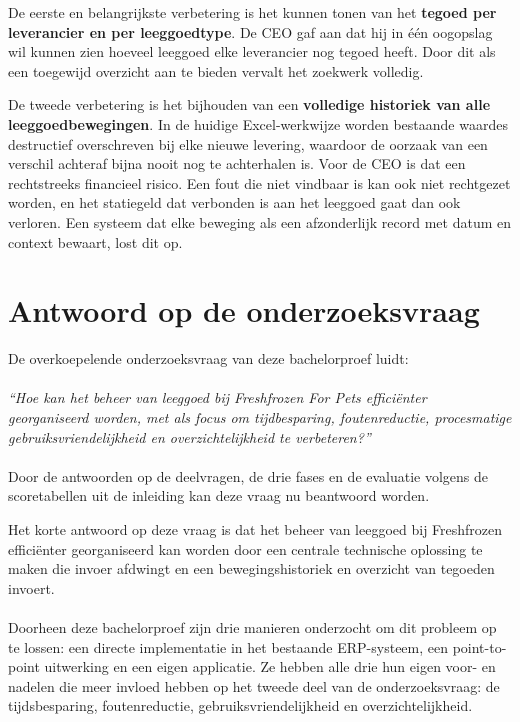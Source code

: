 De eerste en belangrijkste verbetering is het kunnen tonen van het \textbf{tegoed per leverancier en per leeggoedtype}. De CEO gaf aan dat hij in één oogopslag wil kunnen zien hoeveel leeggoed elke leverancier nog tegoed heeft. Door dit als een toegewijd overzicht aan te bieden vervalt het zoekwerk volledig.

De tweede verbetering is het bijhouden van een \textbf{volledige historiek van alle leeggoedbewegingen}. In de huidige Excel-werkwijze worden bestaande waardes destructief overschreven bij elke nieuwe levering, waardoor de oorzaak van een verschil achteraf bijna nooit nog te achterhalen is. Voor de CEO is dat een rechtstreeks financieel risico. Een fout die niet vindbaar is kan ook niet rechtgezet worden, en het statiegeld dat verbonden is aan het leeggoed gaat dan ook verloren. Een systeem dat elke beweging als een afzonderlijk record met datum en context bewaart, lost dit op.

\section{Antwoord op de onderzoeksvraag}

De overkoepelende onderzoeksvraag van deze bachelorproef luidt: 
\\
\\
\emph{``Hoe kan het beheer van leeggoed bij Freshfrozen For Pets efficiënter georganiseerd worden, met als focus om tijdbesparing, foutenreductie, procesmatige gebruiksvriendelijkheid en overzichtelijkheid te verbeteren?''}
\\
\\
Door de antwoorden op de deelvragen, de drie fases en de evaluatie volgens de scoretabellen uit de inleiding kan deze vraag nu beantwoord worden.

Het korte antwoord op deze vraag is dat het beheer van leeggoed bij Freshfrozen efficiënter georganiseerd kan worden door een centrale technische oplossing te maken die invoer afdwingt en een bewegingshistoriek en overzicht van tegoeden invoert.
\\
\\
Doorheen deze bachelorproef zijn drie manieren onderzocht om dit probleem op te lossen: een directe implementatie in het bestaande ERP-systeem, een point-to-point uitwerking en een eigen applicatie. Ze hebben alle drie hun eigen voor- en nadelen die meer invloed hebben op het tweede deel van de onderzoeksvraag: de tijdsbesparing, foutenreductie, gebruiksvriendelijkheid en overzichtelijkheid. 

